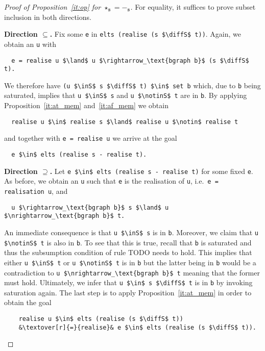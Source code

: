 \documentclass[sigplan,10pt,anonymous,review]{acmart}
\newcommand{\textover}[3][l]{%
 \makebox[\widthof{#3}][#1]{#2}%
}
\newcommand{\diffS}{-_\text{s}}
\newcommand{\inS}{\in_\text{s}}
\newcommand{\notinS}{\notin_\text{s}}
\begin{document}
\begin{proof}[Proof of Proposition~\ref{it:op} for $\star_\texttt{s} = -_\texttt{s}$]
  For equality, it suffices to prove subset inclusion in both directions.

  \textbf{Direction $\subseteq$. } Fix some \lstinline!e! in \lstinline!elts (realise (s $\diffS$ t))!.
  Again, we obtain an \lstinline!u! with 
\begin{lstlisting}
  e = realise u $\land$ u $\rightarrow_\text{bgraph b}$ (s $\diffS$ t).
\end{lstlisting}
  We therefore have \lstinline!(u $\inS$ s $\diffS$ t) $\in$ set b! which, due to \lstinline!b! being saturated, implies that \lstinline!u $\inS$ s! and \lstinline!u $\notinS$ t! are in \lstinline!b!.
  By applying Proposition~\ref{it:at_mem} and~\ref{it:af_mem} we obtain
\begin{lstlisting}
  realise u $\in$ realise s $\land$ realise u $\notin$ realise t
\end{lstlisting}
  and together with \lstinline!e = realise u! we arrive at the goal 
\begin{lstlisting}
  e $\in$ elts (realise s - realise t).
\end{lstlisting}

\textbf{Direction $\supseteq$. } Let \lstinline[columns=fullflexible]!e $\in$ elts (realise s - realise t)! for some fixed \lstinline!e!.
  As before, we obtain an \lstinline!u! such that \lstinline!e! is the realisation of \lstinline!u!, i.e.\ \lstinline!e = realisation u!, and
\begin{lstlisting}
  u $\rightarrow_\text{bgraph b}$ s $\land$ u $\nrightarrow_\text{bgraph b}$ t.
\end{lstlisting}
  An immediate consequence is that \lstinline!u $\inS$ s! is in \lstinline!b!.
  Moreover, we claim that \lstinline!u $\notinS$ t! is also in \lstinline!b!.
  To see that this is true, recall that \lstinline!b! is saturated and thus the subsumption condition of rule TODO needs to hold.
  This implies that either \lstinline!u $\inS$ t! or \lstinline!u $\notinS$ t! is in \lstinline!b! but the latter being in \lstinline!b! would be a contradiction to \lstinline!u $\nrightarrow_\text{bgraph b}$ t! meaning that the former must hold.
  Ultimately, we infer that \lstinline!u $\in$ s $\diffS$ t! is in \lstinline!b! by invoking saturation again.
  The last step is to apply Proposition~\ref{it:at_mem} in order to obtain the goal
  \begin{lstlisting}
    realise u $\in$ elts (realise (s $\diffS$ t))
    &\textover[r]{=}{realise}& e $\in$ elts (realise (s $\diffS$ t)).
  \end{lstlisting}
\end{proof}
\end{document}
